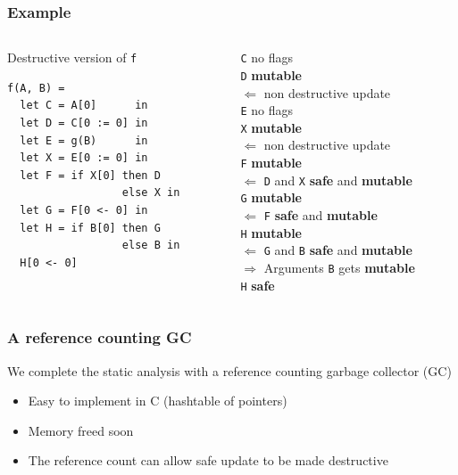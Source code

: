 \documentclass{beamer}
\newcommand{\cl}[1]{\texttt{#1}}
\newcommand{\bang}{\textbf{mutable }}
\newcommand{\safe}{\textbf{safe }}
\begin{document}
\begin{frame}[fragile]
\frametitle{Example}
\begin{columns}
\begin{column}{0.5\textwidth}
Destructive version of \cl{f}
\begin{lstlisting}
f(A, B) =
  let C = A[0]      in
  let D = C[0 := 0] in
  let E = g(B)      in
  let X = E[0 := 0] in
  let F = if X[0] then D
                  else X in
  let G = F[0 <- 0] in
  let H = if B[0] then G
                  else B in
  H[0 <- 0]
\end{lstlisting}
\end{column}
\begin{column}{0.5\textwidth}
\pause
\cl{C} no flags \\
\pause
\cl{D} \bang \\
$\Longleftarrow$ non destructive update\\
\pause
\cl{E} no flags \\
\pause
\cl{X} \bang \\
$\Longleftarrow$ non destructive update\\
\pause
\cl{F} \bang \\
$\Longleftarrow$ \cl{D} and \cl{X} \safe and \bang \\
\pause
\cl{G} \bang \\
$\Longleftarrow$ \cl{F} \safe and \bang \\
\pause
\cl{H} \textbf{ mutable } \\
$\Longleftarrow$ \cl{G} and \cl{B} \safe and \bang \\
\pause
$\Longrightarrow$ Arguments \cl{B} gets \bang \\
\pause
\cl{H} \safe
\end{column}
\end{columns}
\end{frame}

\begin{frame}
\frametitle{A reference counting GC}
We complete the static analysis with a reference counting garbage collector (GC)
\begin{itemize}
\itemsep1em
\item Easy to implement in C (hashtable of pointers)
\item Memory freed soon
\item The reference count can allow safe update to be made destructive
\end{itemize}
\end{frame}
\end{document}
